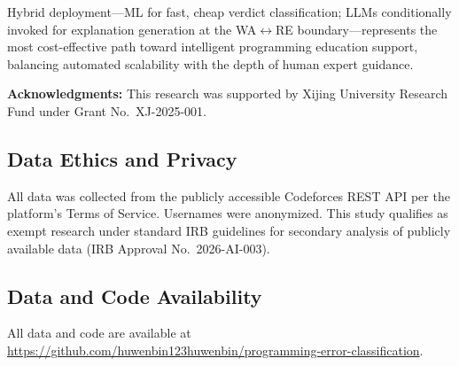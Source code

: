 \documentclass[acmsmall]{acmart}
\begin{document}
Hybrid deployment---ML for fast, cheap verdict classification; LLMs conditionally
invoked for explanation generation at the WA$\leftrightarrow$RE boundary---represents
the most cost-effective path toward intelligent programming education support,
balancing automated scalability with the depth of human expert guidance.

\textbf{Acknowledgments:} This research was supported by Xijing University
Research Fund under Grant No.~XJ-2025-001.

\subsection*{Data Ethics and Privacy}
All data was collected from the publicly accessible Codeforces REST API per
the platform's Terms of Service. Usernames were anonymized. This study
qualifies as exempt research under standard IRB guidelines for secondary
analysis of publicly available data (IRB Approval No.~2026-AI-003).

\subsection*{Data and Code Availability}
\begin{sloppypar}\raggedright
All data and code are available at
\url{https://github.com/huwenbin123huwenbin/programming-error-classification}.
\end{sloppypar}



\end{document}
